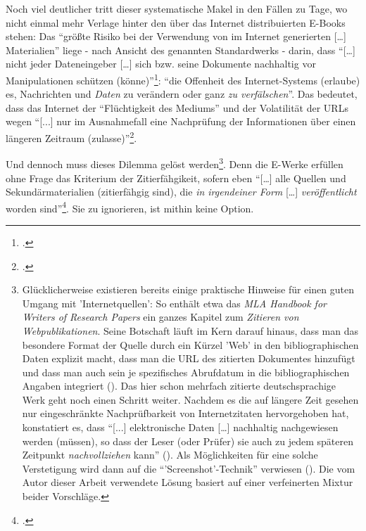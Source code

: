 Noch viel deutlicher tritt dieser systematische Makel in den Fällen zu Tage, wo
nicht einmal mehr Verlage hinter den über das Internet distribuierten E-Books
stehen: Das \enquote{größte Risiko bei der Verwendung von im Internet
generierten [\ldots] Materialien} liege - nach Ansicht des genannten
Standardwerks - darin, dass \enquote{[\ldots] nicht jeder Dateneingeber [\ldots]
sich bzw. seine Dokumente nachhaltig vor Manipulationen schützen
(könne)}\footcite[vgl.][85]{Theisen2013a}: \enquote{die Offenheit des
Internet-Systems (erlaube) es, Nachrichten und \emph{Daten} zu verändern oder
ganz \emph{zu verfälschen}}. Das bedeutet, dass das Internet der
\enquote{Flüchtigkeit des Mediums} und der Volatilität der URLs wegen
\enquote{[...] nur im Ausnahmefall eine Nachprüfung der Informationen über einen
längeren Zeitraum (zulasse)}\footcite[vgl.][86f; herv.i.O]{Theisen2013a}.

Und dennoch muss dieses Dilemma gelöst werden\footnote{Glücklicherweise existieren
bereits einige praktische Hinweise für einen guten Umgang mit 'Internetquellen':
So enthält etwa das \emph{MLA Handbook for Writers of Research Papers} ein
ganzes Kapitel zum \emph{Zitieren von Webpublikationen}. Seine Botschaft läuft
im Kern darauf hinaus, dass man das besondere Format der Quelle durch ein Kürzel
'Web' in den bibliographischen Daten explizit macht, dass man die URL des
zitierten Dokumentes hinzufügt und dass man auch sein je spezifisches Abrufdatum
in die bibliographischen Angaben integriert (\cite[vgl.][182 et
passim]{MlaHdb2009a}). Das hier schon mehrfach zitierte deutschsprachige Werk
geht noch einen Schritt weiter. Nachdem es die auf längere Zeit gesehen nur
eingeschränkte Nachprüfbarkeit von Internetzitaten hervorgehoben hat,
konstatiert es, dass \enquote{[...] elektronische Daten [\ldots] nachhaltig
nachgewiesen werden (müssen), so dass der Leser (oder Prüfer) sie auch zu jedem
späteren Zeitpunkt \emph{nachvollziehen} kann} (\cite[vgl.][86f]{Theisen2013a}).
Als Möglichkeiten für eine solche Verstetigung wird dann auf die
\enquote{'Screenshot'-Technik} verwiesen (\cite[vgl.][80 u. 87]{Theisen2013a}).
Die vom Autor dieser Arbeit verwendete Lösung basiert auf einer verfeinerten
Mixtur beider Vorschläge.}. Denn die E-Werke erfüllen ohne Frage das
Kriterium der Zitierfähgikeit, sofern eben \enquote{[\ldots] alle Quellen und
Sekundärmaterialien (zitierfähgig sind), die \emph{in irgendeiner Form} [\ldots]
\emph{veröffentlicht} worden sind}\footcite[vgl.][160; herv.
K.R]{Theisen2013a}. Sie zu ignorieren, ist mithin keine Option.

